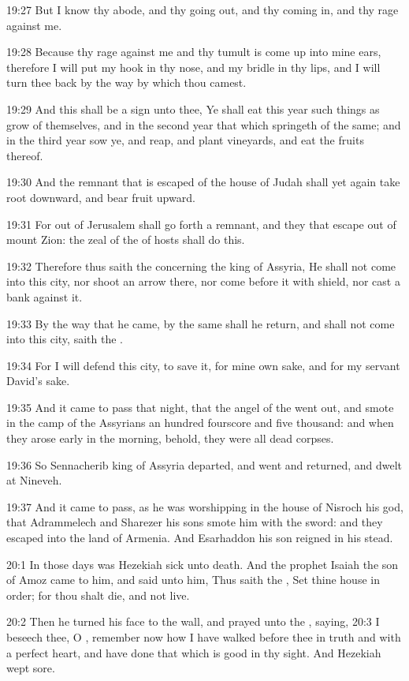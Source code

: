 19:27 But I know thy abode, and thy going out, and thy coming in, and thy rage against me.

19:28 Because thy rage against me and thy tumult is come up into mine ears, therefore I will put my hook in thy nose, and my bridle in thy lips, and I will turn thee back by the way by which thou camest.

19:29 And this shall be a sign unto thee, Ye shall eat this year such things as grow of themselves, and in the second year that which springeth of the same; and in the third year sow ye, and reap, and plant vineyards, and eat the fruits thereof.

19:30 And the remnant that is escaped of the house of Judah shall yet again take root downward, and bear fruit upward.

19:31 For out of Jerusalem shall go forth a remnant, and they that escape out of mount Zion: the zeal of the \LORD of hosts shall do this.

19:32 Therefore thus saith the \LORD concerning the king of Assyria, He shall not come into this city, nor shoot an arrow there, nor come before it with shield, nor cast a bank against it.

19:33 By the way that he came, by the same shall he return, and shall not come into this city, saith the \LORD.

19:34 For I will defend this city, to save it, for mine own sake, and for my servant David's sake.

19:35 And it came to pass that night, that the angel of the \LORD went out, and smote in the camp of the Assyrians an hundred fourscore and five thousand: and when they arose early in the morning, behold, they were all dead corpses.

19:36 So Sennacherib king of Assyria departed, and went and returned, and dwelt at Nineveh.

19:37 And it came to pass, as he was worshipping in the house of Nisroch his god, that Adrammelech and Sharezer his sons smote him with the sword: and they escaped into the land of Armenia. And Esarhaddon his son reigned in his stead.

20:1 In those days was Hezekiah sick unto death. And the prophet Isaiah the son of Amoz came to him, and said unto him, Thus saith the \LORD, Set thine house in order; for thou shalt die, and not live.

20:2 Then he turned his face to the wall, and prayed unto the \LORD, saying, 20:3 I beseech thee, O \LORD, remember now how I have walked before thee in truth and with a perfect heart, and have done that which is good in thy sight. And Hezekiah wept sore.

